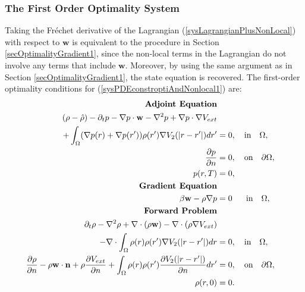\subsubsection{The First Order Optimality System}
Taking the Fr\'echet derivative of the Lagrangian (\ref{sysLagrangianPlusNonLocal}) with respect to $\mathbf{w}$ is equivalent to the procedure in Section \ref{secOptimalityGradient1}, since the non-local terms in the Lagrangian do not involve any terms that include $\mathbf{w}$. 
Moreover, by using the same argument as in Section \ref{secOptimalityGradient1}, the state equation is recovered. 
The first-order optimality conditions for (\ref{sysPDEconstroptiAndNonlocal1}) are:
\begin{align}\label{sysFirstOderOptimalityNonLocal1}
\textbf{Adjoint Equation} \notag \\
 (\rho- \hat{\rho})   - \partial_t  p - \nabla p \cdot  \mathbf{w} - \nabla^2 p
+  \nabla p \cdot \nabla V_{ext}&\\ 
+ \int_\Omega (\nabla  p(r)+\nabla  p(r')) \rho(r') \nabla V_2(|r-r'|) dr' &=0,  \quad \text{in} \quad  \Omega, \notag\\
\frac{\partial p }{\partial n}&=0, \quad \text{on} \quad \partial \Omega, \notag\\
p(r,T)&=0,\notag \\
\textbf{Gradient Equation} \notag \\
\beta \mathbf{w}  - \rho \nabla p &=0 \quad \ \ \text{in} \quad \Omega, \notag \\
\textbf{Forward Problem} \notag \\
\partial_t \rho - \nabla^2 \rho + \nabla \cdot (\rho \mathbf{w}) - \nabla \cdot (\rho \nabla V_{ext})& \notag\\
- \nabla \cdot \int_\Omega \rho(r) \rho(r') \nabla V_2(|r-r'|) dr&=0, \quad \text{in} \quad \Omega,\notag\\
\dfrac{\partial \rho}{\partial n} - \rho \mathbf{w} \cdot \mathbf{n} + \rho \dfrac{\partial V_{ext}}{\partial n}+\int_\Omega \rho(r) \rho(r') \frac{\partial V_2(|r-r'|)}{\partial n} dr' &=0,\quad \text{on} \quad  \partial \Omega, \notag\\
\rho(r,0)&=0 \notag.
\end{align}









